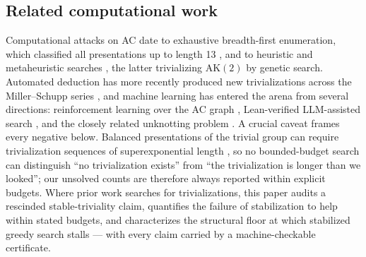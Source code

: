 \subsection{Related computational work}

Computational attacks on AC date to exhaustive breadth-first enumeration, which classified
all presentations up to length 13 \cite{havas2003bfs}, and to heuristic and metaheuristic
searches \cite{bowman2006fast,miasnikov1999genetic}, the latter trivializing
$\mathrm{AK}(2)$ by genetic search. Automated deduction has more recently produced new
trivializations across the Miller--Schupp series \cite{lisitsa2024newtrivializations}, and
machine learning has entered the arena from several directions: reinforcement learning
over the AC graph \cite{fagan2026twohump}, Lean-verified LLM-assisted search
\cite{zhang2025aidriven}, and the closely related unknotting problem \cite{gukov2021unknot}.
A crucial caveat frames every negative below. Balanced presentations of the trivial group
can require trivialization sequences of superexponential length
\cite{bridson2015complexity,lishak2017balanced}, so no bounded-budget search can
distinguish ``no trivialization exists'' from ``the trivialization is longer than we
looked''; our unsolved counts are therefore always reported within explicit budgets. Where
prior work searches for trivializations, this paper audits a rescinded stable-triviality
claim, quantifies the failure of stabilization to help within stated budgets, and
characterizes the structural floor at which stabilized greedy search stalls --- with every
claim carried by a machine-checkable certificate.
